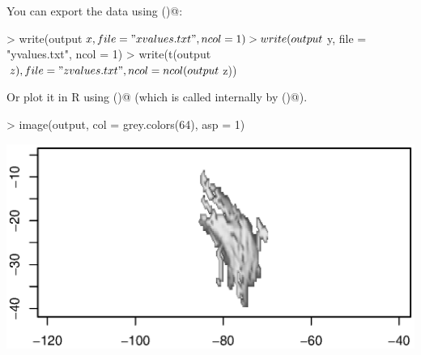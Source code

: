 \documentclass{article}
\renewenvironment{Schunk}{\vspace{\topsep}}{\vspace{\topsep}}
\begin{document}
You can export the data using \verb@write()@:
\begin{Schunk}
\begin{Sinput}
> write(output$x, file = "xvalues.txt", ncol = 1)
> write(output$y, file = "yvalues.txt", ncol = 1)
> write(t(output$z), file = "zvalues.txt", ncol = ncol(output$z))
\end{Sinput}
\end{Schunk}

Or plot it in R using \verb@image()@ (which is called internally by
\verb@showmap()@). 
\begin{Schunk}
\begin{Sinput}
> image(output, col = grey.colors(64), asp = 1)
\end{Sinput}
\end{Schunk}
\includegraphics{figures/fig-026}
\end{document}
